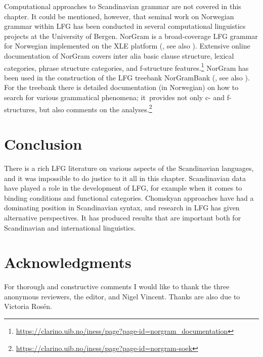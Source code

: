 \documentclass[output=paper,hidelinks]{langscibook}
\begin{document}
Computational approaches to Scandinavian grammar are not covered in this chapter. It could be mentioned, however, that seminal work on Norwegian grammar within LFG has been conducted in several computational linguistics projects at the University of Bergen. NorGram is a broad-coverage LFG grammar for Norwegian implemented on the XLE platform (\citealt{Dyvik00}, see also ). Extensive online documentation of NorGram covers inter alia basic clause structure, lexical categories, phrase structure categories, and f-structure features.\footnote{\url{https://clarino.uib.no/iness/page?page-id=norgram\_documentation}} NorGram has been used in the construction of the LFG treebank NorGramBank (\citealt{dyvikEtAl2016}, see also ). For the treebank there is detailed documentation (in Norwegian) on how to search for various grammatical phenomena; it~provides not only c- and f-structures, but also comments on the analyses.\footnote{\url{https://clarino.uib.no/iness/page?page-id=norgram-soek}}

\section{Conclusion}

There is a rich LFG literature on various aspects of the Scandinavian languages, and it was impossible to do justice to it all in this chapter. Scandinavian data have played a role in the development of LFG, for example when it comes to binding conditions and functional categories. Chomskyan approaches have had a dominating position in Scandinavian syntax, and research in LFG has given alternative perspectives. It has produced results that are important both for Scandinavian and international linguistics.

\section*{Acknowledgments}

For thorough and constructive comments I would like to thank the three
anonymous reviewers, the editor, and Nigel Vincent. Thanks are also due to Victoria Rosén.
\sloppy
\printbibliography[heading=subbibliography,notkeyword=this]
\end{document}
